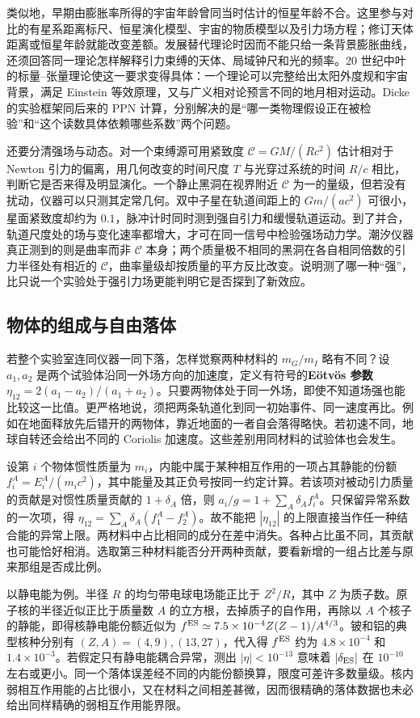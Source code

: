 类似地，早期由膨胀率所得的宇宙年龄曾同当时估计的恒星年龄不合。这里参与对比的有星系距离标尺、恒星演化模型、宇宙的物质模型以及引力场方程；修订天体距离或恒星年龄就能改变差额。发展替代理论时因而不能只给一条背景膨胀曲线，还须回答同一理论怎样解释引力束缚的天体、局域钟尺和光的频率。20 世纪中叶的标量--张量理论使这一要求变得具体：一个理论可以完整给出太阳外度规和宇宙背景，满足 Einstein 等效原理，又与广义相对论预言不同的地月相对运动。Dicke 的实验框架同后来的 PPN 计算，分别解决的是“哪一类物理假设正在被检验”和“这个读数具体依赖哪些系数”两个问题。

还要分清强场与动态。对一个束缚源可用紧致度 $\mathcal C=GM/(Rc^2)$ 估计相对于 Newton 引力的偏离，用几何改变的时间尺度 $T$ 与光穿过系统的时间 $R/c$ 相比，判断它是否来得及明显演化。一个静止黑洞在视界附近 $\mathcal C$ 为一的量级，但若没有扰动，仪器可以只测其定常几何。双中子星在轨道间距上的 $Gm/(ac^2)$ 可很小，星面紧致度却约为 $0.1$，脉冲计时同时测到强自引力和缓慢轨道运动。到了并合，轨道尺度处的场与变化速率都增大，才可在同一信号中检验强场动力学。潮汐仪器真正测到的则是曲率而非 $\mathcal C$ 本身；两个质量极不相同的黑洞在各自相同倍数的引力半径处有相近的 $\mathcal C$，曲率量级却按质量的平方反比改变。说明测了哪一种“强”，比只说一个实验处于强引力场更能判明它是否探到了新效应。

\subsection{物体的组成与自由落体}

若整个实验室连同仪器一同下落，怎样觉察两种材料的 $m_G/m_I$ 略有不同？设 $a_1,a_2$ 是两个试验体沿同一外场方向的加速度，定义有符号的\textbf{Eötvös 参数} $\eta_{12}=2(a_1-a_2)/(a_1+a_2)$。只要两物体处于同一外场，即使不知道场强也能比较这一比值。更严格地说，须把两条轨道化到同一初始事件、同一速度再比。例如在地面释放先后错开的两物体，靠近地面的一者自会落得略快。若初速不同，地球自转还会给出不同的 Coriolis 加速度。这些差别用同材料的试验体也会发生。

设第 $i$ 个物体惯性质量为 $m_i$，内能中属于某种相互作用的一项占其静能的份额 $f_i^A=E_i^A/(m_ic^2)$，其中能量及其正负号按同一约定计算。若该项对被动引力质量的贡献是对惯性质量贡献的 $1+\delta_A$ 倍，则 $a_i/g=1+\sum_A\delta_A f_i^A$。只保留异常系数的一次项，得 $\eta_{12}=\sum_A \delta_A(f_1^A-f_2^A)$。故不能把 $|\eta_{12}|$ 的上限直接当作任一种结合能的异常上限。两材料中占比相同的成分在差中消失。各种占比虽不同，其贡献也可能恰好相消。选取第三种材料能否分开两种贡献，要看新增的一组占比差与原来那组是否成比例。

以静电能为例。半径 $R$ 的均匀带电球电场能正比于 $Z^2/R$，其中 $Z$ 为质子数。原子核的半径近似正比于质量数 $A$ 的立方根，去掉质子的自作用，再除以 $A$ 个核子的静能，即得核静电能份额近似为 $f^{\rm ES}\simeq7.5\times10^{-4}Z(Z-1)/A^{4/3}$。铍和铝的典型核种分别有 $(Z,A)=(4,9),(13,27)$，代入得 $f^{\rm ES}$ 约为 $4.8\times10^{-4}$ 和 $1.4\times10^{-3}$。若假定只有静电能耦合异常，测出 $|\eta|<10^{-13}$ 意味着 $|\delta_{\rm ES}|$ 在 $10^{-10}$ 左右或更小。同一个落体误差经不同的内能份额换算，限度可差许多数量级。核内弱相互作用能的占比很小，又在材料之间相差甚微，因而很精确的落体数据也未必给出同样精确的弱相互作用能界限。

